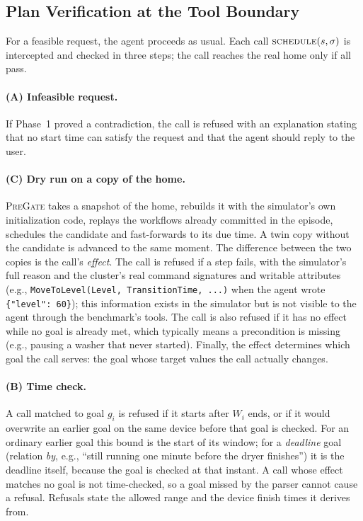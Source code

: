 \documentclass[sigconf]{aamas}
\newcommand{\sys}{\textsc{PreGate}}
\begin{document}
\subsection{Plan Verification at the Tool Boundary}

For a feasible request, the agent proceeds as usual. Each call $\textsc{schedule}(s,\sigma)$ is intercepted and
checked in three steps; the call reaches the real home only if all pass.

\paragraph{(A) Infeasible request.} If Phase~1 proved a contradiction, the call is refused with an explanation
stating that no start time can satisfy the request and that the agent should reply to the user.

\paragraph{(C) Dry run on a copy of the home.} \sys{} takes a snapshot of the home, rebuilds it with the
simulator's own initialization code, replays the workflows already committed in the episode, schedules the
candidate and fast-forwards to its due time. A twin copy without the candidate is advanced to the same moment.
The difference between the two copies is the call's \emph{effect}. The call is refused if a step fails, with
the simulator's full reason and the cluster's real command signatures and writable attributes
(e.g., \texttt{MoveToLevel(Level, TransitionTime, ...)} when the agent wrote \texttt{\{"level": 60\}}); this
information exists in the simulator but is not visible to the agent through the benchmark's tools. The call is
also refused if it has no effect while no goal is already met, which typically means a precondition is missing
(e.g., pausing a washer that never started). Finally, the effect determines which goal the call serves: the goal
whose target values the call actually changes.

\paragraph{(B) Time check.} A call matched to goal $g_i$ is refused if it starts after $W_i$ ends, or if it would
overwrite an earlier goal on the same device before that goal is checked. For an ordinary earlier goal this bound
is the start of its window; for a \emph{deadline} goal (relation \textit{by}, e.g., ``still running one minute
before the dryer finishes'') it is the deadline itself, because the goal is checked at that instant. A call
whose effect matches no goal is not time-checked, so a goal missed by the parser cannot cause a refusal.
Refusals state the allowed range and the device finish times it derives from.
\end{document}
